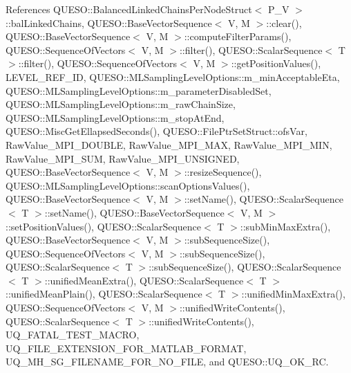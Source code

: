 References Q\-U\-E\-S\-O\-::\-Balanced\-Linked\-Chains\-Per\-Node\-Struct$<$ P\-\_\-\-V $>$\-::bal\-Linked\-Chains, Q\-U\-E\-S\-O\-::\-Base\-Vector\-Sequence$<$ V, M $>$\-::clear(), Q\-U\-E\-S\-O\-::\-Base\-Vector\-Sequence$<$ V, M $>$\-::compute\-Filter\-Params(), Q\-U\-E\-S\-O\-::\-Sequence\-Of\-Vectors$<$ V, M $>$\-::filter(), Q\-U\-E\-S\-O\-::\-Scalar\-Sequence$<$ T $>$\-::filter(), Q\-U\-E\-S\-O\-::\-Sequence\-Of\-Vectors$<$ V, M $>$\-::get\-Position\-Values(), L\-E\-V\-E\-L\-\_\-\-R\-E\-F\-\_\-\-I\-D, Q\-U\-E\-S\-O\-::\-M\-L\-Sampling\-Level\-Options\-::m\-\_\-min\-Acceptable\-Eta, Q\-U\-E\-S\-O\-::\-M\-L\-Sampling\-Level\-Options\-::m\-\_\-parameter\-Disabled\-Set, Q\-U\-E\-S\-O\-::\-M\-L\-Sampling\-Level\-Options\-::m\-\_\-raw\-Chain\-Size, Q\-U\-E\-S\-O\-::\-M\-L\-Sampling\-Level\-Options\-::m\-\_\-stop\-At\-End, Q\-U\-E\-S\-O\-::\-Misc\-Get\-Ellapsed\-Seconds(), Q\-U\-E\-S\-O\-::\-File\-Ptr\-Set\-Struct\-::ofs\-Var, Raw\-Value\-\_\-\-M\-P\-I\-\_\-\-D\-O\-U\-B\-L\-E, Raw\-Value\-\_\-\-M\-P\-I\-\_\-\-M\-A\-X, Raw\-Value\-\_\-\-M\-P\-I\-\_\-\-M\-I\-N, Raw\-Value\-\_\-\-M\-P\-I\-\_\-\-S\-U\-M, Raw\-Value\-\_\-\-M\-P\-I\-\_\-\-U\-N\-S\-I\-G\-N\-E\-D, Q\-U\-E\-S\-O\-::\-Base\-Vector\-Sequence$<$ V, M $>$\-::resize\-Sequence(), Q\-U\-E\-S\-O\-::\-M\-L\-Sampling\-Level\-Options\-::scan\-Options\-Values(), Q\-U\-E\-S\-O\-::\-Base\-Vector\-Sequence$<$ V, M $>$\-::set\-Name(), Q\-U\-E\-S\-O\-::\-Scalar\-Sequence$<$ T $>$\-::set\-Name(), Q\-U\-E\-S\-O\-::\-Base\-Vector\-Sequence$<$ V, M $>$\-::set\-Position\-Values(), Q\-U\-E\-S\-O\-::\-Scalar\-Sequence$<$ T $>$\-::sub\-Min\-Max\-Extra(), Q\-U\-E\-S\-O\-::\-Base\-Vector\-Sequence$<$ V, M $>$\-::sub\-Sequence\-Size(), Q\-U\-E\-S\-O\-::\-Sequence\-Of\-Vectors$<$ V, M $>$\-::sub\-Sequence\-Size(), Q\-U\-E\-S\-O\-::\-Scalar\-Sequence$<$ T $>$\-::sub\-Sequence\-Size(), Q\-U\-E\-S\-O\-::\-Scalar\-Sequence$<$ T $>$\-::unified\-Mean\-Extra(), Q\-U\-E\-S\-O\-::\-Scalar\-Sequence$<$ T $>$\-::unified\-Mean\-Plain(), Q\-U\-E\-S\-O\-::\-Scalar\-Sequence$<$ T $>$\-::unified\-Min\-Max\-Extra(), Q\-U\-E\-S\-O\-::\-Sequence\-Of\-Vectors$<$ V, M $>$\-::unified\-Write\-Contents(), Q\-U\-E\-S\-O\-::\-Scalar\-Sequence$<$ T $>$\-::unified\-Write\-Contents(), U\-Q\-\_\-\-F\-A\-T\-A\-L\-\_\-\-T\-E\-S\-T\-\_\-\-M\-A\-C\-R\-O, U\-Q\-\_\-\-F\-I\-L\-E\-\_\-\-E\-X\-T\-E\-N\-S\-I\-O\-N\-\_\-\-F\-O\-R\-\_\-\-M\-A\-T\-L\-A\-B\-\_\-\-F\-O\-R\-M\-A\-T, U\-Q\-\_\-\-M\-H\-\_\-\-S\-G\-\_\-\-F\-I\-L\-E\-N\-A\-M\-E\-\_\-\-F\-O\-R\-\_\-\-N\-O\-\_\-\-F\-I\-L\-E, and Q\-U\-E\-S\-O\-::\-U\-Q\-\_\-\-O\-K\-\_\-\-R\-C.


